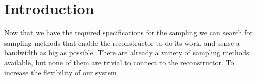 \documentclass[a4paper, openany, oneside]{memoir}
\begin{document}
\section{Introduction}
Now that we have the required specifications for the sampling we can search for sampling methods that enable the reconstructor to do its work, and sense a bandwidth as big as possible. There are already a variety of sampling methods available, but none of them are trivial to connect to the reconstructor. To increase the flexibility of our system 
\end{document}
